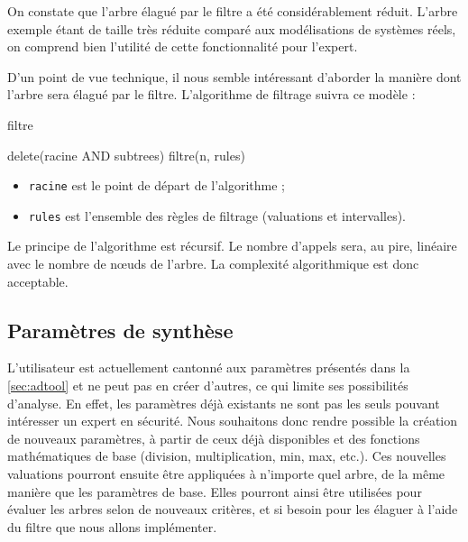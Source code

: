 		On constate que l'arbre élagué par le filtre a été considérablement réduit. L'arbre exemple étant de taille très réduite comparé aux modélisations de systèmes réels, on comprend bien l'utilité de cette fonctionnalité pour l'expert.

		D'un point de vue technique, il nous semble intéressant d'aborder la manière dont l'arbre sera élagué par le filtre. L'algorithme de filtrage suivra ce modèle :

		\begin{algorithm}[h!]
			\caption{filtre}
		\begin{algorithmic}
						\STATE delete(racine AND subtrees)
						\RETURN
					\ENDIF
				\ENDFOR
					\STATE filtre(n, rules)
				\ENDFOR

		\end{algorithmic}
		\end{algorithm}

		\begin{itemize}
		 \item \verb|racine| est le point de départ de l'algorithme ;
		 \item \verb|rules| est l'ensemble des règles de filtrage (valuations et intervalles).
		\end{itemize}
	
		Le principe de l'algorithme est récursif. Le nombre d'appels sera, au pire, linéaire avec le nombre de nœuds de l'arbre. La complexité algorithmique est donc acceptable.

		\subsection{Paramètres de synthèse}
		\label{subsection:synthese} 

			L'utilisateur est actuellement cantonné aux paramètres présentés dans la  \ref{sec:adtool} et ne peut pas en créer d'autres, ce qui limite ses possibilités d'analyse. En effet, les paramètres déjà existants ne sont pas les seuls pouvant intéresser un expert en sécurité. Nous souhaitons donc rendre possible la création de nouveaux paramètres, à partir de ceux déjà disponibles et des fonctions mathématiques de base (division, multiplication, min, max, etc.). Ces nouvelles valuations pourront ensuite être appliquées à n'importe quel arbre, de la même manière que les paramètres de base. Elles pourront ainsi être utilisées pour évaluer les arbres selon de nouveaux critères, et si besoin pour les élaguer à l'aide du filtre que nous allons implémenter.

